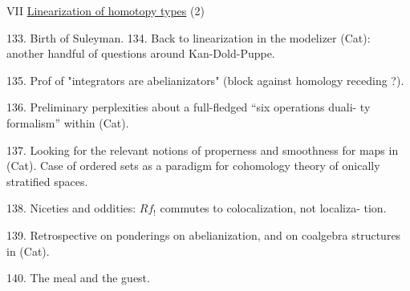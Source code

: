 VII \quad \uline{Linearization of homotopy types}  (2)

133. Birth of Suleyman.
134. Back to linearization in the modelizer (Cat): another handful of
questions around Kan-Dold-Puppe.

135. Prof of "integrators are abelianizators" (block against homology
receding ?).

136. Preliminary perplexities about a full-fledged ``six operations duali-%
ty formalism'' within (Cat).

137. Looking for the relevant notions of properness and smoothness for
maps in (Cat). Case of ordered sets as a paradigm for cohomology
theory of onically stratified spaces.

138. Niceties and oddities: $Rf_!$ commutes to colocalization, not localiza-%
tion.

139. Retrospective on ponderings on abelianization, and on coalgebra
structures in (Cat).

140. The meal and the guest.


